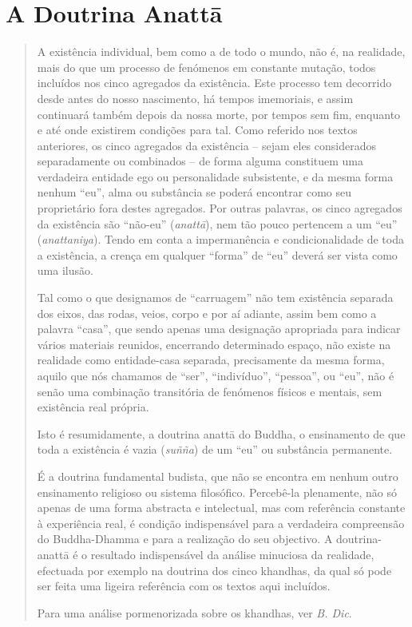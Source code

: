 
\section{A Doutrina Anattā}

\begin{quote}
  A existência individual, bem como a de todo o mundo, não é, na realidade, mais
  do que um processo de fenómenos em constante mutação, todos incluídos nos
  cinco agregados da existência. Este processo tem decorrido desde antes do
  nosso nascimento, há tempos imemoriais, e assim continuará também depois da
  nossa morte, por tempos sem fim, enquanto e até onde existirem condições para
  tal. Como referido nos textos anteriores, os cinco agregados da existência --
  sejam eles considerados separadamente ou combinados -- de forma alguma
  constituem uma verdadeira entidade ego ou personalidade subsistente, e da
  mesma forma nenhum ``eu'', alma ou substância se poderá encontrar como seu
  proprietário fora destes agregados. Por outras palavras, os cinco agregados da
  existência são ``não-eu'' (\emph{anattā}), nem tão pouco pertencem a um ``eu''
  (\emph{anattaniya}). Tendo em conta a impermanência e condicionalidade de toda
  a existência, a crença em qualquer ``forma'' de ``eu'' deverá ser vista como
  uma ilusão.

  Tal como o que designamos de ``carruagem'' não tem existência separada dos
  eixos, das rodas, veios, corpo e por aí adiante, assim bem como a palavra
  ``casa'', que sendo apenas uma designação apropriada para indicar vários
  materiais reunidos, encerrando determinado espaço, não existe na realidade
  como entidade-casa separada, precisamente da mesma forma, aquilo que nós
  chamamos de ``ser'', ``indivíduo'', ``pessoa'', ou ``eu'', não é senão uma
  combinação transitória de fenómenos físicos e mentais, sem existência real
  própria.

  Isto é resumidamente, a doutrina anattā do Buddha, o ensinamento de que toda a
  existência é vazia (\emph{suñña}) de um ``eu'' ou substância permanente.

  É a doutrina fundamental budista, que não se encontra em nenhum outro
  ensinamento religioso ou sistema filosófico. Percebê-la plenamente, não só
  apenas de uma forma abstracta e intelectual, mas com referência constante à
  experiência real, é condição indispensável para a verdadeira compreensão do
  Buddha-Dhamma e para a realização do seu objectivo. A doutrina-anattā é o
  resultado indispensável da análise minuciosa da realidade, efectuada por
  exemplo na doutrina dos cinco khandhas, da qual só pode ser feita uma ligeira
  referência com os textos aqui incluídos.

  Para uma análise pormenorizada sobre os khandhas, ver \emph{B. Dic}.
\end{quote}

